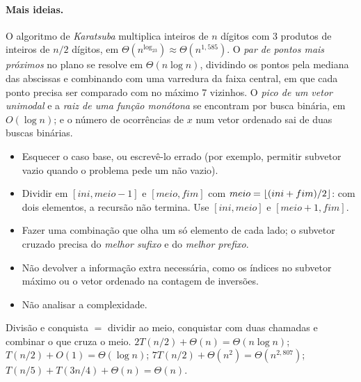 \paragraph{Mais ideias.} O algoritmo de \emph{Karatsuba} multiplica inteiros de $n$ dígitos com 3 produtos de inteiros de $n/2$ dígitos, em $\Theta(n^{\log_23})\approx\Theta(n^{1{,}585})$. O \emph{par de pontos mais próximos} no plano se resolve em $\Theta(n\log n)$, dividindo os pontos pela mediana das abscissas e combinando com uma varredura da faixa central, em que cada ponto precisa ser comparado com no máximo 7 vizinhos. O \emph{pico de um vetor unimodal} e a \emph{raiz de uma função monótona} se encontram por busca binária, em $O(\log n)$; e o número de ocorrências de $x$ num vetor ordenado sai de duas buscas binárias.

\begin{cuidado}
\begin{itemize}
  \item Esquecer o caso base, ou escrevê-lo errado (por exemplo, permitir subvetor vazio quando o problema pede um não vazio).
  \item Dividir em $[ini,meio-1]$ e $[meio,fim]$ com $meio=\lfloor(ini+fim)/2\rfloor$: com dois elementos, a recursão não termina. Use $[ini,meio]$ e $[meio+1,fim]$.
  \item Fazer uma combinação que olha um só elemento de cada lado; o subvetor cruzado precisa do \emph{melhor sufixo} e do \emph{melhor prefixo}.
  \item Não devolver a informação extra necessária, como os índices no subvetor máximo ou o vetor ordenado na contagem de inversões.
  \item Não analisar a complexidade.
\end{itemize}
\end{cuidado}

\begin{chave}
Divisão e conquista $=$ dividir ao meio, conquistar com duas chamadas e combinar o que cruza o meio. $2T(n/2)+\Theta(n)=\Theta(n\log n)$; $T(n/2)+O(1)=\Theta(\log n)$; $7T(n/2)+\Theta(n^2)=\Theta(n^{2{,}807})$; $T(n/5)+T(3n/4)+\Theta(n)=\Theta(n)$.
\end{chave}

